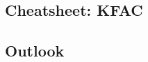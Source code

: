 \documentclass{article}
\begin{document}
\begin{paracol}{1}
  \section{Cheatsheet: KFAC}\label{sec:kfac-cheatsheet}
  
  \end{paracol}
\clearpage

\begin{paracol}{1}
  \section{Outlook}\label{sec:outlook}
  
\end{paracol}
\clearpage



\appendix
\end{document}
